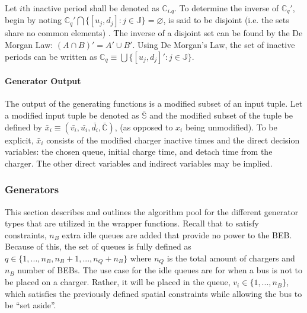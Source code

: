 \documentclass[11pt,a4paper,final]{article}
\newcommand{\C}{\mathbb{C}}                 %
\newcommand{\Sol}{\mathbb{S}}               %
\newcommand{\Jsetq}{\mathbb{J}}             %
\begin{document}
Let \(i\text{th}\) inactive period shall be denoted as \(\C_{i.q}\). To determine the inverse of \(\C_q'\), begin by noting
\(\C_q' \bigcap \{[u_j, d_j] : j \in \Jsetq\} = \varnothing\), is said to be disjoint (i.e. the sets share no common elements)
\cite{halmos-1974-naive-set-theor}. The inverse of a disjoint set can be found by the De Morgan Law: \((A \cap B)' = A' \cup
B'\). Using De Morgan's Law, the set of inactive periods can be written as \(\C_q \equiv \bigcup \{[u_j, d_j]': j \in \Jsetq\}\).

\paragraph{Generator Output}
\label{sec:org2957474}
The output of the generating functions is a modified subset of an input tuple. Let a modified input tuple be denoted as
\(\bar{\Sol}\) and the modified subset of the tuple be defined by \(\bar{x}_i \equiv (\bar{v_i}, \bar{u_i}, \bar{d_i},
\bar{\C})\), (as opposed to \(x_i\) being unmodified). To be explicit, \(\bar{x}_i\) consists of the modified charger
inactive times and the direct decision variables: the chosen queue, initial charge time, and detach time from the
charger. The other direct variables and indirect variables may be implied.

\subsubsection{Generators}
\label{sec:generators}
This section describes and outlines the algorithm pool for the different generator types that are utilized in the
wrapper functions. Recall that to satisfy constraints, \(n_B\) extra idle queues are added that provide no power to the
BEB. Because of this, the set of queues is fully defined as \(q \in \{1,..., n_B, n_B+1,..., n_Q+n_B\}\) where \(n_Q\) is the
total amount of chargers and \(n_B\) number of BEBs. The use case for the idle queues are for when a bus is not to be
placed on a charger. Rather, it will be placed in the queue, \(v_i \in \{1,..., n_B\}\), which satisfies the previously
defined spatial constraints while allowing the bus to be ``set aside''.
\end{document}
